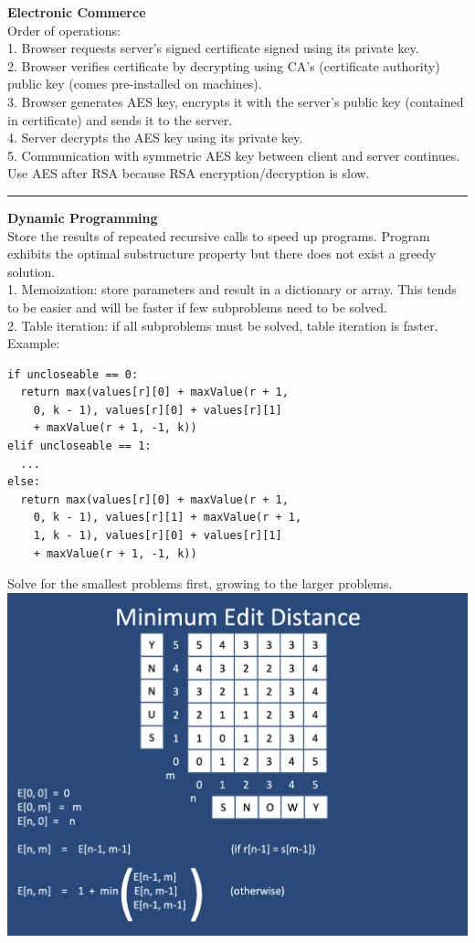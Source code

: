 \documentclass[9pt]{amsart}
\begin{document}
\begin{multicols*}{3}
  \textbf{Electronic Commerce} \\
  Order of operations: \\
  1. Browser requests server’s signed certificate signed using its private key. \\
  2. Browser verifies certificate by decrypting using CA’s (certificate authority) public key (comes pre-installed on machines). \\
  3. Browser generates AES key, encrypts it with the server’s public key (contained in certificate) and sends it to the server. \\
  4. Server decrypts the AES key using its private key. \\
  5. Communication with symmetric AES key between client and server continues. \\
  Use AES after RSA because RSA encryption/decryption is slow.

  \vskip 7pt
  \hrule
  \vskip 7pt

  \textbf{Dynamic Programming} \\
  Store the results of repeated recursive calls to speed up programs. Program exhibits the optimal substructure property but there does not exist a greedy solution. \\
  1. Memoization: store parameters and result in a dictionary or array. This tends to be easier and will be faster if few subproblems need to be solved. \\
  2. Table iteration: if all subproblems must be solved, table iteration is faster. \\
  Example:
  \begin{lstlisting}
if uncloseable == 0:
  return max(values[r][0] + maxValue(r + 1, 
    0, k - 1), values[r][0] + values[r][1] 
    + maxValue(r + 1, -1, k))
elif uncloseable == 1:
  ...
else:
  return max(values[r][0] + maxValue(r + 1, 
    0, k - 1), values[r][1] + maxValue(r + 1, 
    1, k - 1), values[r][0] + values[r][1] 
    + maxValue(r + 1, -1, k))
  \end{lstlisting}
  Solve for the smallest problems first, growing to the larger problems.
  \includegraphics[width=\columnwidth]{minimum_edit.png}


\end{multicols*}
\end{document}
